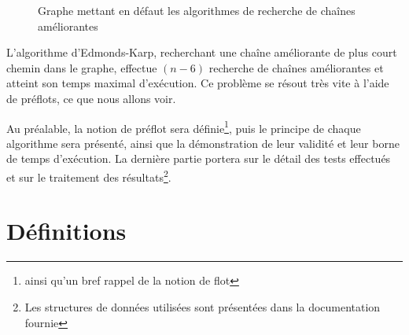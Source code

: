 \begin{figure}[h!]
	\begin{center}
	\end{center}
	\caption{Graphe mettant en défaut les algorithmes de recherche de chaînes améliorantes}
	\label{graphe_defaut}
\end{figure}

L'algorithme d'Edmonds-Karp, recherchant une chaîne améliorante de plus court chemin dans le graphe,
effectue $(n-6)$ recherche de chaînes améliorantes et atteint son temps maximal d'exécution. Ce
problème se résout très vite à l'aide de préflots, ce que nous allons voir.

Au préalable, la notion de préflot sera définie\footnote{ainsi qu'un bref rappel de la notion de
flot}, puis le principe de chaque algorithme sera présenté, ainsi que la démonstration de leur
validité et leur borne de temps d'exécution. La dernière partie portera sur le détail des tests
effectués et sur le traitement des résultats\footnote{Les structures de données utilisées sont
présentées dans la documentation fournie}.

\section{Définitions}

